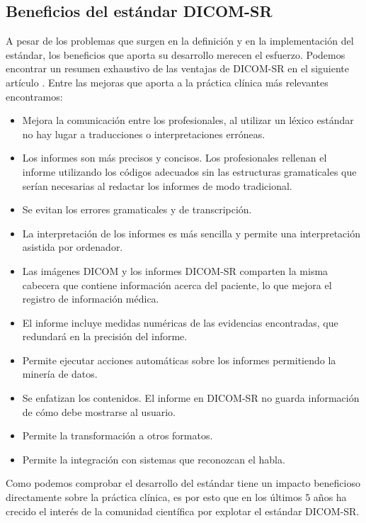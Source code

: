 \subsection{Beneficios del estándar DICOM-SR}\label{dicom:beneficios}
A pesar de los problemas que surgen en la definición y en la implementación del estándar, los beneficios que aporta su desarrollo merecen el esfuerzo. Podemos encontrar un resumen exhaustivo de las ventajas de DICOM-SR en el siguiente artículo \cite{noumeir2006benefits}. Entre las mejoras que aporta a la práctica clínica más relevantes encontramos: 
\begin{itemize}
	\item Mejora la comunicación entre los profesionales, al utilizar un léxico estándar no hay lugar a traducciones o 	interpretaciones erróneas. 
	\item Los informes son más precisos y concisos. Los profesionales rellenan el informe utilizando los códigos adecuados sin 	las estructuras gramaticales que serían necesarias al redactar los informes de modo tradicional. 
	\item Se evitan los errores gramaticales y de transcripción.
	\item La interpretación de los informes es más sencilla y permite una interpretación asistida por ordenador. 
	\item Las imágenes DICOM y los informes DICOM-SR comparten la misma cabecera que contiene información acerca del paciente, 	lo que mejora el registro de información médica.
	\item El informe incluye medidas numéricas de las evidencias encontradas, que redundará en la precisión del informe.
	\item Permite ejecutar acciones automáticas sobre los informes permitiendo la minería de datos.
	\item Se enfatizan los contenidos. El informe en DICOM-SR no guarda información de cómo debe mostrarse al usuario.
	\item Permite la transformación a otros formatos. 
	\item Permite la integración con sistemas que reconozcan el habla. 
\end{itemize} 
Como podemos comprobar el desarrollo del estándar tiene un impacto beneficioso directamente sobre la práctica clínica, es por esto que en los últimos 5 años ha crecido el interés de la comunidad científica por explotar el estándar DICOM-SR.\par

